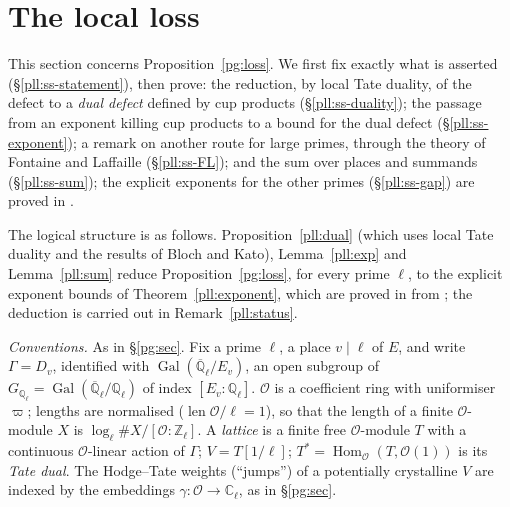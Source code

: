 \documentclass[10pt]{amsart}
\theoremstyle{definition}
\theoremstyle{remark}
\newcommand{\C}{\mathbb C}
\newcommand{\Z}{\mathbb Z}
\newcommand{\Q}{\mathbb Q}
\begin{document}
\providecommand{\auO}{\mathcal O}
\providecommand{\auQlb}{\overline{\Q}_\ell}
\providecommand{\panot}[1]{\par\smallskip{\raggedright\noindent\textbf{[Not proved here:} #1\textbf{]}\par}\smallskip}
\providecommand{\pgv}{v}
\providecommand{\pgloc}{\mathrm{loc}}
\providecommand{\pgcyc}{\varepsilon_\ell}
\providecommand{\pglen}{\operatorname{len}}
\providecommand{\pgHom}{\operatorname{Hom}}
\providecommand{\pllZf}{Z_f}
\providecommand{\pllperp}{\perp}
\providecommand{\pllrk}{\operatorname{rk}}
\providecommand{\plldef}{\delta^{\vee}}
\providecommand{\pllB}{B_{\mathrm{cris}}}
\providecommand{\pllD}{\mathrm{dB}}

\section{The local loss}\label{pll:sec}

This section concerns Proposition~\ref{pg:loss}. We first fix exactly what is asserted
(\S\ref{pll:ss-statement}), then prove: the reduction, by local Tate duality, of the defect to a
\emph{dual defect} defined by cup products (\S\ref{pll:ss-duality}); the passage from an exponent
killing cup products to a bound for the dual defect (\S\ref{pll:ss-exponent}); a remark on another route for large
primes, through the theory of Fontaine and Laffaille (\S\ref{pll:ss-FL}); and the sum over places and
summands (\S\ref{pll:ss-sum}); the explicit exponents for the other primes
(\S\ref{pll:ss-gap}) are proved in {\cite[\S\S2--9]{P56}}.

The logical structure is as follows. Proposition~\ref{pll:dual} (which uses local Tate duality and
the results of Bloch and Kato), Lemma~\ref{pll:exp} and Lemma~\ref{pll:sum} reduce
Proposition~\ref{pg:loss}, for every prime $\ell$, to the explicit exponent bounds of
Theorem~\ref{pll:exponent}, which are proved in {\cite[\S2]{P56}} from
{\cite[\S\S3.1--9]{P56}}; the deduction is carried out in Remark~\ref{pll:status}.

\emph{Conventions.} As in \S\ref{pg:sec}. Fix a prime $\ell$, a place $v\mid\ell$ of $E$, and write
$\Gamma=D_v$, identified with $\operatorname{Gal}(\auQlb/E_v)$, an open subgroup of
$G_{\Q_\ell}=\operatorname{Gal}(\auQlb/\Q_\ell)$ of index $[E_v:\Q_\ell]$. $\auO$ is a coefficient
ring with uniformiser $\varpi$; lengths are normalised ($\pglen\auO/\ell=1$), so that the length of
a finite $\auO$-module $X$ is $\log_\ell\#X/[\auO:\Z_\ell]$. A \emph{lattice} is a finite free $\auO$-module $T$
with a continuous $\auO$-linear action of $\Gamma$; $V=T[1/\ell]$; $T^*=\pgHom_\auO(T,\auO(1))$ is
its \emph{Tate dual}. The Hodge--Tate weights (``jumps'') of a potentially crystalline $V$ are
indexed by the embeddings $\gamma\colon\auO\to\C_\ell$, as in \S\ref{pg:sec}.
\end{document}
